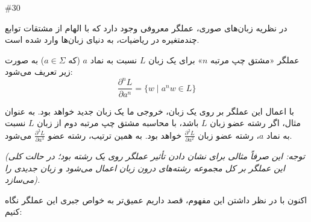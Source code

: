 \documentclass[../HW.tex]{subfiles}
\begin{document}
\question#{30}

در نظریه زبان‌های صوری، عملگر معروفی وجود دارد که با الهام از مشتقات توابع چندمتغیره در ریاضیات، به دنیای زبان‌ها وارد شده است.

عملگر «مشتق چپ مرتبه $n$» برای یک زبان $L$ نسبت به نماد $a$ (که $a \in \Sigma$) به صورت زیر تعریف می‌شود:
$$ \frac{\partial^n L}{\partial a^n} = \{ w \mid a^n w \in L \} $$

با اعمال این عملگر بر روی یک زبان، خروجی ما یک زبان جدید خواهد بود. به عنوان مثال، اگر رشته  عضو زبان $L$ باشد، با محاسبه مشتق چپ مرتبه دوم از زبان $L$ نسبت به نماد $a$، رشته  عضو زبان $\frac{\partial^2 L}{\partial a^2}$ خواهد بود. به همین ترتیب، رشته  عضو $\frac{\partial^3 L}{\partial a^3}$ می‌شود.

\textit{(توجه: این صرفاً مثالی برای نشان دادن تأثیر عملگر روی یک رشته بود؛ در حالت کلی این عملگر بر کل مجموعه رشته‌های درون زبان اعمال می‌شود و زبان جدیدی را می‌سازد).}

اکنون با در نظر داشتن این مفهوم، قصد داریم عمیق‌تر به خواص جبری این عملگر نگاه کنیم:
\end{document}
